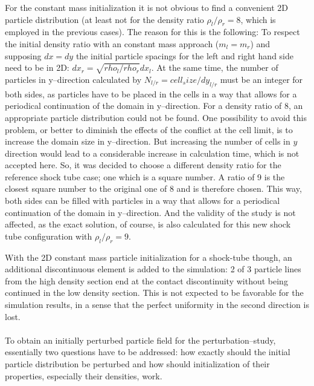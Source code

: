 \documentclass[11pt,a4paper,twoside]{report}
\begin{document}
For the constant mass initialization it is not obvious to find a convenient 2D particle distribution (at least not for the density ratio $\rho_l/\rho_r=8$, which is employed in the previous cases). The reason for this is the following:
To respect the initial density ratio with an constant mass approach ($m_l=m_r$) and supposing $dx=dy$ the initial particle spacings for the left and right hand side need to be in 2D: $dx_r=\sqrt{rho_l/rho_r} dx_l$.
At the same time, the number of particles in y--direction calculated by $N_{l/r}=\mathit{cell_size}/dy_{l/r}$ must 
be an integer for both sides, as particles have to be placed in the cells in a way that allows for a periodical continuation of the domain in y--direction.
For a density ratio of 8, an appropriate particle distribution could not be found. One possibility to avoid this problem, or better to diminish the effects of the conflict at the cell limit, is to increase the domain size in y--direction. But increasing the number of cells in $y$ direction would lead to a considerable increase in calculation time, which is not accepted here. So, it was decided to choose a different density ratio for the reference shock tube case; one which is a square number. A ratio of 9 is the closest square number to the original one of 8 and is therefore chosen.
This way, both sides can be filled with particles in a way that allows for a periodical continuation of the domain in y--direction. And the validity of the study is not affected, as the exact solution, of course, is also calculated for this new shock tube configuration with $\rho_l/\rho_r=9$. 

With the 2D constant mass particle initialization for a shock-tube though, an additional discontinuous element is added to the simulation: 2 of 3 particle lines from the high density section end at the contact discontinuity without being continued in the low density section. This is not expected to be favorable for the simulation results, in a sense that the perfect uniformity in the second direction is lost.\\
\\
\indent                                                                                                                                                                                                                                                                                                                                                                   
 To obtain an initially perturbed particle field for the perturbation--study, essentially two questions have to be addressed: how exactly should the initial particle distribution be perturbed and how should initialization of their properties, especially their densities, work.         
                                                                                                                                              
\end{document}
